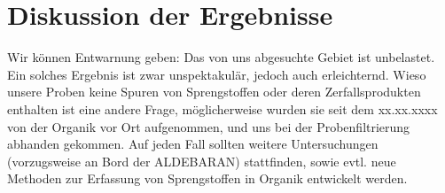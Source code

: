 \section{Diskussion der Ergebnisse}
Wir können Entwarnung geben: Das von uns abgesuchte Gebiet ist unbelastet. Ein
solches Ergebnis ist zwar unspektakulär, jedoch auch erleichternd. Wieso 
unsere Proben keine Spuren von Sprengstoffen oder deren Zerfallsprodukten 
enthalten ist eine andere Frage, möglicherweise wurden sie seit dem xx.xx.xxxx%
von der Organik vor Ort aufgenommen, und uns bei der Probenfiltrierung
abhanden gekommen. Auf jeden Fall sollten weitere Untersuchungen (vorzugsweise
an Bord der ALDEBARAN) stattfinden, sowie evtl. neue Methoden zur Erfassung
von Sprengstoffen in Organik entwickelt werden.
